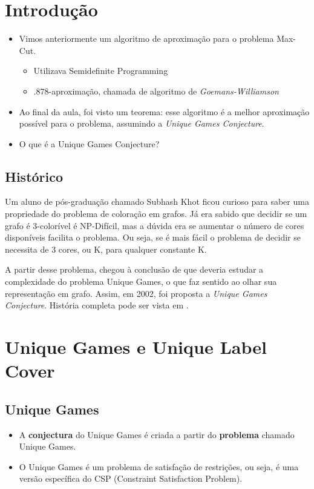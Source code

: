 \documentclass[12pt,a4paper]{article}
\begin{document}


\section{Introdução}
\begin{itemize}
    \item Vimos anteriormente um algoritmo de aproximação para o problema Max-Cut.
    \begin{itemize}
        \item Utilizava Semidefinite Programming
        \item .878-aproximação, chamada de algoritmo de \emph{Goemans-Williamson}
    \end{itemize}
    \item Ao final da aula, foi visto um teorema: esse algoritmo é a melhor aproximação possível para o problema, assumindo a \emph{Unique Games Conjecture}.
    \item O que é a Unique Games Conjecture?
\end{itemize}

\subsection{Histórico}
Um aluno de pós-graduação chamado Subhash Khot ficou curioso para saber uma propriedade do problema de coloração em grafos. Já era sabido que decidir se um grafo é 3-colorível é NP-Difícil, mas a dúvida era se aumentar o número de cores disponíveis facilita o problema. Ou seja, se é mais fácil o problema de decidir se necessita de 3 cores, ou K, para qualquer constante K.

A partir desse problema, chegou à conclusão de que deveria estudar a complexidade do problema Unique Games, o que faz sentido ao olhar sua representação em grafo. Assim, em 2002, foi proposta a \emph{Unique Games Conjecture}. História completa pode ser vista em \cite{history}.

\section{Unique Games e Unique Label Cover}

\subsection{Unique Games}
\begin{itemize}
    \item A \textbf{conjectura} do Unique Games é criada a partir do \textbf{problema} chamado Unique Games.
    \item O Unique Games é um problema de satisfação de restrições, ou seja, é uma versão específica do CSP (Constraint Satisfaction Problem).
\end{itemize}
\end{document}
